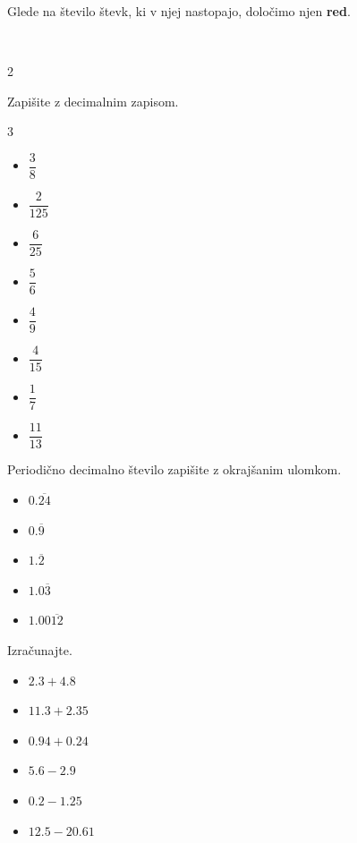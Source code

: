         Glede na število števk, ki v njej nastopajo, določimo njen \textbf{red}.

        


        ~\\
        \begin{multicols}{2}
            

    \begin{naloga}
        Zapišite z decimalnim zapisom.
        \begin{multicols}{3}
        \begin{itemize}
                    \item $\dfrac{3}{8}$ 
                    \item $\dfrac{2}{125}$ 
                    \item $\dfrac{6}{25}$ 
                    \item $\dfrac{5}{6}$ 
                    \item $\dfrac{4}{9}$ 
                    \item $\dfrac{4}{15}$ 
                    \item $\dfrac{1}{7}$ 
                    \item $\dfrac{11}{13}$ 
       \end{itemize}
    \end{multicols}
    \end{naloga}



    \begin{naloga}
        Periodično decimalno število zapišite z okrajšanim ulomkom.
        \begin{itemize}
                    \item $0.\overline{24}$ 
                    \item $0.\overline{9}$ 
                    \item $1.\overline{2}$ 
                    \item $1.0\overline{3}$ 
                    \item $1.00\overline{12}$ 
        \end{itemize}
    \end{naloga}

    


    \begin{naloga}
        Izračunajte.
        \begin{itemize}
                    \item $2.3+4.8$ 
                    \item $11.3+2.35$ 
                    \item $0.94+0.24$ 
                    \item $5.6-2.9$ 
                    \item $0.2-1.25$ 
                    \item $12.5-20.61$ 
        \end{itemize}
    \end{naloga}


\end{multicols}
